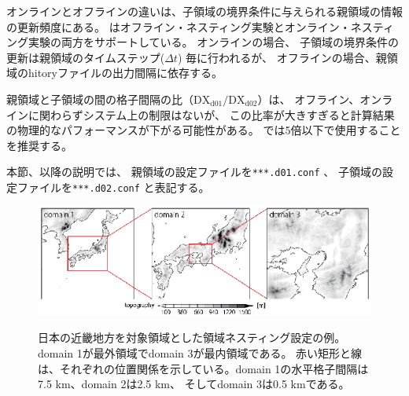 オンラインとオフラインの違いは、子領域の境界条件に与えられる親領域の情報の更新頻度にある。
\scalerm はオフライン・ネスティング実験とオンライン・ネスティング実験の両方をサポートしている。
オンラインの場合、
子領域の境界条件の更新は親領域のタイムステップ($\Delta t$) 毎に行われるが、
オフラインの場合、親領域のhitoryファイルの出力間隔に依存する。

親領域と子領域の間の格子間隔の比（$\mathrm{DX}_{\mathrm{d01}}/\mathrm{DX}_{\mathrm{d02}}$）は、
オフライン、オンラインに関わらずシステム上の制限はないが、
この比率が大きすぎると計算結果の物理的なパフォーマンスが下がる可能性がある。
\scalerm では5倍以下で使用することを推奨する。

本節、以降の説明では、
親領域の設定ファイルを\verb|***.d01.conf| 、
子領域の設定ファイルを\verb|***.d02.conf| と表記する。

\begin{figure}[t]
\begin{center}
  \includegraphics[width=1.0\hsize]{./figure/nesting_sample.eps}\\
  \caption{日本の近畿地方を対象領域とした領域ネスティング設定の例。 
    domain 1が最外領域でdomain 3が最内領域である。
    赤い矩形と線は、それぞれの位置関係を示している。domain 1の水平格子間隔は7.5 km、domain 2は2.5 km、
    そしてdomain 3は0.5 kmである。}
  \label{fig_nestsample}
\end{center}
\end{figure}


~~\\
~~\\


